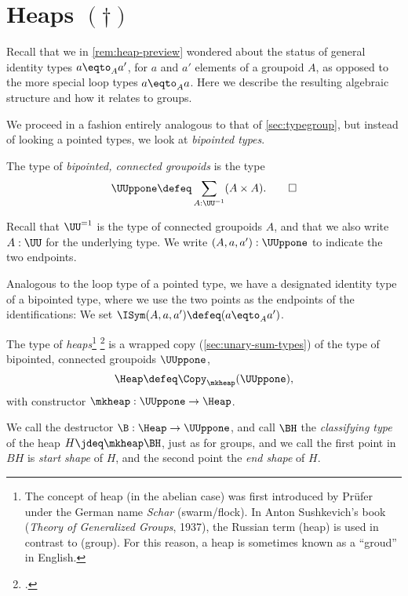 \section{Heaps \texorpdfstring{$(\dagger)$}{(\textdagger) \color{red} just moved from symmetry without proofreading BID211116}}
\label{sec:heaps}

Recall that we in \cref{rem:heap-preview} wondered about
the status of general identity types $a\eqto_A a'$,
for $a$ and $a'$ elements of a groupoid $A$,
as opposed to the more special loop types $a\eqto_Aa$.
Here we describe the resulting algebraic structure
and how it relates to groups.

We proceed in a fashion entirely analogous to that of \cref{sec:typegroup},
but instead of looking a pointed types, we look at \emph{bipointed types}.

\begin{definition}\label{def:bipt-conn-groupoid}
  The type of \emph{bipointed, connected groupoids} is the type
  \[
    \UUppone \defeq \sum_{A:\UU^{=1}}(A \times A).\qedhere
  \]
\end{definition}
Recall that $\UU^{=1}$ is the type of connected groupoids $A$,
and that we also write $A:\UU$ for the underlying type.
We write $(A,a,a'):\UUppone$ to indicate the two endpoints.

Analogous to the loop type of a pointed type,
we have a designated identity type of a bipointed type,
where we use the two points as the endpoints of the identifications:
We set $\ISym(A,a,a') \defeq (a \eqto_A a')$.

\begin{definition}\label{def:heap}
  The type of \emph{heaps}\footnote{%
    The concept of heap (in the abelian case)
    was first introduced by Prüfer\footnotemark{}
    under the German name \emph{Schar} (swarm/flock).
    In Anton Sushkevich's book
    (\emph{Theory of Generalized Groups}, 1937),
    the Russian term  (heap)
    is used in contrast to  (group).
    For this reason, a heap is sometimes
    known as a ``groud'' in English.}%
  \footcitetext{Pruefer-AG}
  is a wrapped copy (\cf \cref{sec:unary-sum-types})
  of the type of bipointed, connected groupoids $\UUppone$,
  \[
    \Heap \defeq \Copy_{\mkheap}(\UUppone),
  \]
  with constructor $\mkheap : \UUppone \to \Heap$.
\end{definition}
We call the destructor $\B : \Heap \to \UUppone$,
and call $\BH$ the \emph{classifying type} of the heap $H \jdeq\mkheap\BH$,
just as for groups,
and we call the first point in $BH$ is \emph{start shape} of $H$,
and the second point the \emph{end shape} of $H$.

